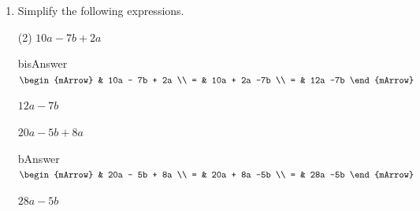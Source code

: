 \begin{enumerate}[resume]
\begin{subtask}
    \end{subtask}
\end{enumerate}


\begin{enumerate}[resume]	
  \item Simplify the following expressions.
  \begin{subtask}(2)
    \task[]  $ 10a - 7b + 2a  $
              \begin{envOut}[height=6cm]{bisAnswer}
			       $\begin{mArrow}
			                & 10a - 7b + 2a       \\ 
                          = & 10a + 2a -7b       \\ 
                          = & 12a -7b 
	                \end{mArrow}$
              \end{envOut}			  
			  \begin{exercise}\begin{shortsolution}  
				       $12a -7b$
			  \end{shortsolution}\end{exercise}
			  
    \task[]  $ 20a - 5b + 8a  $
              \begin{envOut}[height=6cm]{bAnswer}
			       $\begin{mArrow}
			                & 20a - 5b + 8a       \\ 
                          = & 20a + 8a -5b       \\ 
                          = & 28a -5b 
	                \end{mArrow}$
              \end{envOut}			  
			  \begin{exercise}\begin{shortsolution}  
				       $28a -5b$
			  \end{shortsolution}\end{exercise}			  
    \end{subtask}
\end{enumerate}




